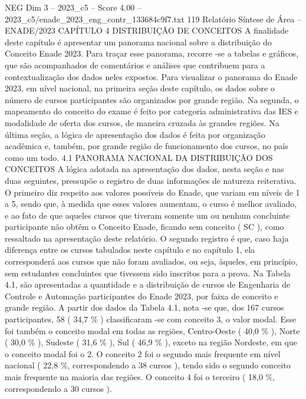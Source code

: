 \begin{textsample}{NEG Dim 3 – 2023\_c5 – Score 4.00 – 2023\_c5/enade\_2023\_eng\_contr\_133684c9f7.txt}  \label{ex:f3_neg_231}
119 Relatório Síntese de Área – ENADE/2023 CAPÍTULO 4 DISTRIBUIÇÃO DE CONCEITOS A finalidade deste capítulo é apresentar um panorama nacional sobre a distribuição do Conceito Enade 2023.
Para traçar esse panorama, recorre -se a tabelas e gráficos, que são acompanhados de comentários e análises que contribuem para a contextualização dos dados neles expostos.
Para visualizar o panorama do Enade 2023, em nível nacional, na primeira seção deste capítulo, os dados sobre o número de cursos participantes são organizados por grande região.
Na segunda, o mapeamento do conceito do exame é feito por categoria administrativa das IES e modalidade de oferta dos cursos, de maneira cruzada às grandes regiões.
Na última seção, a lógica de apresentação dos dados é feita por organização acadêmica e, também, por grande região de funcionamento dos cursos, no país como um todo. 4.1 PANORAMA NACIONAL DA DISTRIBUIÇÃO DOS CONCEITOS A lógica adotada na apresentação dos dados, nesta seção e nas duas seguintes, pressupõe o registro de duas informações de natureza reiterativa.
O primeiro diz respeito aos valores possíveis do Enade, que variam em níveis de 1 a 5, sendo que, à medida que esses valores aumentam, o curso é melhor avaliado, e ao fato de que aqueles cursos que tiveram somente um ou nenhum concluinte participante não obtêm o Conceito Enade, ficando sem conceito ( SC ), como ressaltado na apresentação deste relatório.
O segundo registro é que, caso haja diferença entre os cursos tabulados neste capítulo e no capítulo 1, ela corresponderá aos cursos que não foram avaliados, ou seja, àqueles, em princípio, sem estudantes concluintes que tivessem sido inscritos para a prova.
Na Tabela 4.1, são apresentadas a quantidade e a distribuição de cursos de Engenharia de Controle e Automação participantes do Enade 2023, por faixa de conceito e grande região.
A partir dos dados da Tabela 4.1, nota -se que, dos 167 cursos participantes, 58 ( 34,7 \% ) classificaram -se com conceito 3, o valor modal.
Esse foi também o conceito modal em todas as regiões, Centro-Oeste ( 40,0 \% ), Norte ( 30,0 \% ), Sudeste ( 31,6 \% ), Sul ( 46,9 \% ), exceto na região Nordeste, em que o conceito modal foi o 2.
O conceito 2 foi o segundo mais frequente em nível nacional ( 22,8 \%, correspondendo a 38 cursos ), tendo sido o segundo conceito mais frequente na maioria das regiões.
O conceito 4 foi o terceiro ( 18,0 \%, correspondendo a 30 cursos ).

\end{textsample}
